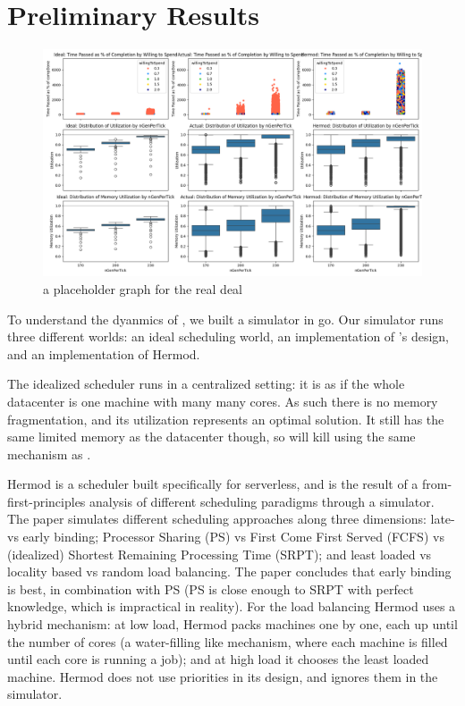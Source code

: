 \section{Preliminary Results}

\begin{figure}[t!]
    \centering
      \includegraphics[width=15cm]{img/combined_res.png}
      \caption{ a placeholder graph for the real deal }
    \label{fig:graph}
\end{figure}

To understand the dyanmics of \sys{}, we built a simulator in go. Our simulator
runs three different worlds: an ideal scheduling world, an implementation of
\sys{}'s design, and an implementation of Hermod\cite{TODO}. 

The idealized scheduler runs in a centralized setting: it is as if the whole
datacenter is one machine with many many cores. As such there is no memory
fragmentation, and its utilization represents an optimal solution. It still has
the same limited memory as the datacenter though, so will kill using the same
mechanism as \sys{}.

Hermod is a scheduler built specifically for serverless, and is the result of a
from-first-principles analysis of different scheduling paradigms through a
simulator. The paper simulates different scheduling approaches along three
dimensions: late-vs early binding; Processor Sharing (PS) vs First Come First
Served (FCFS) vs (idealized) Shortest Remaining Processing Time (SRPT); and
least loaded vs locality based vs random load balancing. The paper concludes
that early binding is best, in combination with PS (PS is close enough to SRPT
with perfect knowledge, which is impractical in reality). For the load balancing
Hermod uses a hybrid mechanism: at low load, Hermod packs machines one by one,
each up until the number of cores (a water-filling like mechanism, where each
machine is filled until each core is running a job); and at high load it chooses
the least loaded machine. Hermod does not use priorities in its design, and
ignores them in the simulator.


